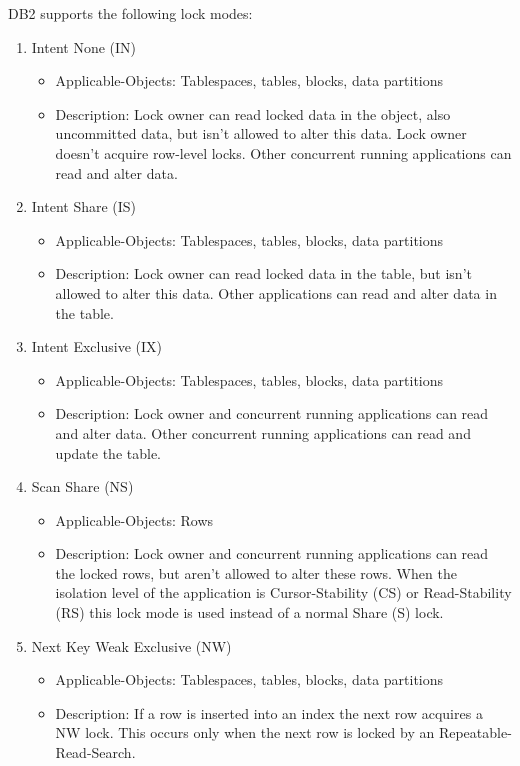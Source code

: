 \documentclass{vldb}
\begin{document}
DB2 supports the following lock modes:
\begin{enumerate}
\item Intent None (IN)
\begin{itemize}
\item Applicable-Objects: Tablespaces, tables, blocks, data partitions
\item Description: Lock owner can read locked data in the object, also uncommitted data, but isn't allowed to alter this data. Lock owner doesn't acquire row-level locks. 
Other concurrent running applications can read and alter data.
\end{itemize}
\item Intent Share (IS)
\begin{itemize}
\item Applicable-Objects: Tablespaces, tables, blocks, data partitions
\item Description: Lock owner can read locked data in the table, but isn't allowed to alter this data. Other applications can read and alter data in the table.
\end{itemize}
\item Intent Exclusive (IX)
\begin{itemize}
\item Applicable-Objects: Tablespaces, tables, blocks, data partitions
\item Description: Lock owner and concurrent running applications can read and alter data. Other concurrent running applications can read and update the table.
\end{itemize}
\item Scan Share (NS)
\begin{itemize}
\item Applicable-Objects: Rows
\item Description: Lock owner and concurrent running applications can read the locked rows, but aren't allowed to alter these rows. When the isolation level of the
application is Cursor-Stability (CS) or Read-Stability (RS) this lock mode is used instead of a normal Share (S) lock. 
\end{itemize}
\item Next Key Weak Exclusive (NW)
\begin{itemize}
\item Applicable-Objects: Tablespaces, tables, blocks, data partitions
\item Description: If a row is inserted into an index the next row acquires a NW lock. This occurs only when the next row is locked by an Repeatable-Read-Search.

\end{itemize}
\end{enumerate}
\end{document}
